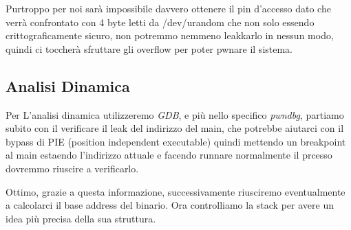 \documentclass[main.tex]{subfiles}
\begin{document}
Purtroppo per noi sarà impossibile davvero ottenere il pin d'accesso dato che verrà confrontato con 4 byte letti da /dev/urandom che non solo essendo crittograficamente sicuro, non potremmo nemmeno leakkarlo in nessun modo, quindi ci toccherà sfruttare gli overflow per poter pwnare il sistema.

\hspace*{1in}
\subsection{Analisi Dinamica}

\hspace*{0.25in}Per L'analisi dinamica utilizzeremo \textit{GDB}, e più nello specifico \textit{pwndbg}, partiamo subito con il verificare il leak del indirizzo del main, che potrebbe aiutarci con il bypass di PIE (position independent executable) quindi mettendo un breakpoint al main estaendo l'indirizzo attuale e facendo runnare normalmente il prcesso dovremmo riuscire a verificarlo.
\begin{figure}[h]
    \centering
    \captionsetup{aboveskip=0pt}
\end{figure}

Ottimo, grazie a questa informazione, successivamente riusciremo eventualmente a calcolarci il base address del binario.
Ora controlliamo la stack per avere un idea più precisa della sua struttura.
\begin{figure}[h]
    \centering
    \captionsetup{aboveskip=0pt}
\end{figure}
\end{document}
